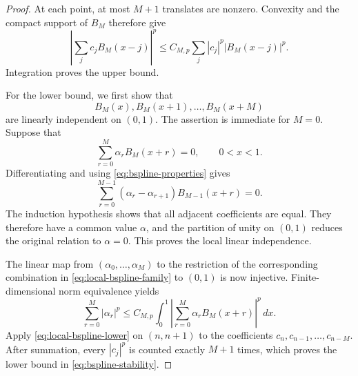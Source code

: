 \documentclass[11pt]{amsart}
\theoremstyle{plain}
\theoremstyle{definition}
\theoremstyle{remark}
\numberwithin{equation}{section}
\theoremstyle{plain}
\begin{document}
\begin{proof}
	At each point, at most $M+1$ translates are nonzero.  Convexity and
	the compact support of $B_M$ therefore give
	\[
	\left|\sum_jc_jB_M(x-j)\right|^p
	\le C_{M,p}\sum_j|c_j|^p|B_M(x-j)|^p.
	\]
	Integration proves the upper bound.
	
	For the lower bound, we first show that
	\begin{equation}\label{eq:local-bspline-family}
		B_M(x),B_M(x+1),\ldots,B_M(x+M)
	\end{equation}
	are linearly independent on $(0,1)$.  The assertion is immediate for $M=0$.
	Suppose that
	\[
	\sum_{r=0}^{M}\alpha_rB_M(x+r)=0,
	\qquad 0<x<1.
	\]
	Differentiating and using \eqref{eq:bspline-properties} gives
	\[
	\sum_{r=0}^{M-1}(\alpha_r-\alpha_{r+1})B_{M-1}(x+r)=0.
	\]
	The induction hypothesis shows that all adjacent coefficients are equal.
	They therefore have a common value $\alpha$, and the partition of unity on
	$(0,1)$ reduces the original relation to $\alpha=0$.  This proves the local
	linear independence.
	
	The linear map from $(\alpha_0,\ldots,\alpha_M)$ to the restriction of the
	corresponding combination in \eqref{eq:local-bspline-family} to $(0,1)$ is
	now injective.  Finite-dimensional norm equivalence yields
	\begin{equation}\label{eq:local-bspline-lower}
		\sum_{r=0}^{M}|\alpha_r|^p
		\le C_{M,p}\int_0^1
		\left|\sum_{r=0}^{M}\alpha_rB_M(x+r)\right|^p\,dx.
	\end{equation}
	Apply \eqref{eq:local-bspline-lower} on $(n,n+1)$ to the coefficients
	$c_n,c_{n-1},\ldots,c_{n-M}$.  After summation, every $|c_j|^p$ is counted
	exactly $M+1$ times, which proves the lower bound in
	\eqref{eq:bspline-stability}.
\end{proof}
\end{document}
